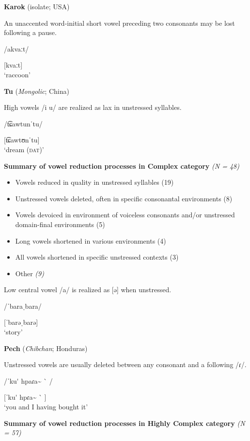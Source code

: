 \ea   \textbf{Karok} (isolate; USA)

An unaccented word-initial short vowel preceding two consonants may be lost following a pause.

/akvaːt/

[kvaːt]\\
\glt ‘raccoon’
\citep[53]{Bright1957}

\ex  \textbf{Tu} (\textit{Mongolic}; China)

High vowels /i u/ are realized as lax in unstressed syllables. 

/t͡ɕawtunˈtu/

[t͡ɕawtʊnˈtu]\\
\glt ‘dream (\textsc{dat})’
\citep[35]{Slater2003}
\z
\z

\ea\label{ex:6.18}
  \textbf{Summary of vowel reduction processes in Complex category} \textit{(N = 48)}

\begin{itemize}
\item Vowels reduced in quality in unstressed syllables (19)
\item Unstressed vowels deleted, often in specific consonantal environments (8)
\item Vowels devoiced in environment of voiceless consonants and/or unstressed domain-final environments  {(5)}
\item Long vowels shortened in various environments  {(4)}
\item All vowels shortened in specific unstressed contexts (3)
\item Other \textit{(9)}
\end{itemize}

\ea{}

Low central vowel /a/ is realized as [ə] when unstressed.

/ˈbaraˌbara/

[ˈbarəˌbarə]\\
\glt ‘story’
\citep[17-18]{Rumsey1978}

\ex  \textbf{Pech} (\textit{Chibchan}; Honduras)

Unstressed vowels are usually deleted between any consonant and a following /ɾ/.

/ˈku\'{} hpaɾa\~{} \`{} /

[ˈku\'{} hpɾa\~{} \`{} ]\\
\glt ‘you and I having bought it’
\citep[23]{Holt1999}
\z
\z

\ea\label{ex:6.19}
  \textbf{Summary of vowel reduction processes in Highly Complex category} \textit{(N = 57)}

